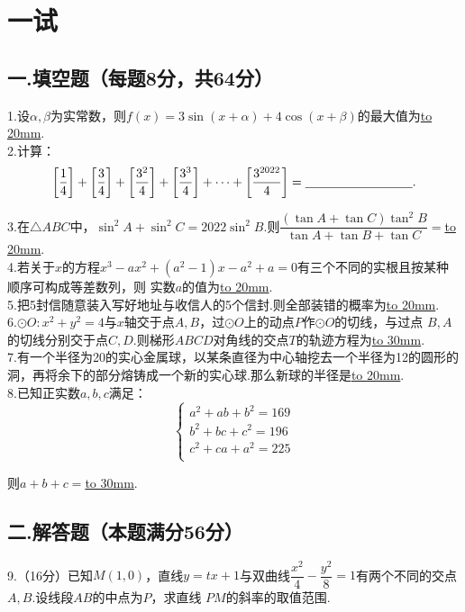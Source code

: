 \section*{一试}
\subsection*{一.填空题（每题8分，共64分）}
1.设$\alpha,\beta$为实常数，则$f(x)=3\sin{(x+\alpha)}+4\cos{(x+\beta)}$的最大值为\underline{\hbox to 20mm{}}.
~\\

2.计算：
\[
	\left[\dfrac{1}{4}\right]+\left[\dfrac{3}{4}\right]+\left[\dfrac{3^2}{4}\right]+\left[\dfrac{3^3}{4}\right]+\cdots+\left[\dfrac{3^{2022}}{4}\right]=\underline{\hbox to 30mm{}}.
\]

3.在$\bigtriangleup ABC$中，$\sin^2{A}+\sin^2{C}=2022\sin^2{B}$.则$\dfrac{(\tan{A}+\tan{C})\tan^2{B}}{\tan{A}+\tan{B}+\tan{C}}=$\underline{\hbox to 20mm{}}.
~\\

4.若关于$x$的方程$x^3-ax^2+(a^2-1)x-a^2+a=0$有三个不同的实根且按某种顺序可构成等差数列，则
实数$a$的值为\underline{\hbox to 20mm{}}.
~\\

5.把5封信随意装入写好地址与收信人的5个信封.则全部装错的概率为\underline{\hbox to 20mm{}}.
~\\

6.$\odot O:x^2+y^2=4$与$x$轴交于点$A,B$，过$\odot O$上的动点$P$作$\odot O$的切线，与过点
$B,A$的切线分别交于点$C,D$.则梯形$ABCD$对角线的交点$T$的轨迹方程为\underline{\hbox to 30mm{}}.
~\\

7.有一个半径为20的实心金属球，以某条直径为中心轴挖去一个半径为12的圆形的洞，再将余下的部分熔铸成一个新的实心球.那么新球的半径是\underline{\hbox to 20mm{}}.
~\\

8.已知正实数$a,b,c$满足：
$$
\begin{cases}
	a^2+ab+b^2=169\\
	b^2+bc+c^2=196\\
	c^2+ca+a^2=225\\
\end{cases}
$$

则$a+b+c=$\underline{\hbox to 30mm{}}.
~\\

\subsection*{二.解答题（本题满分56分）}
9.（16分）已知$M(1,0)$，直线$y=tx+1$与双曲线$\dfrac{x^2}{4}-\dfrac{y^2}{8}=1$有两个不同的交点$A,B$.设线段$AB$的中点为$P$，求直线
$PM$的斜率的取值范围.





